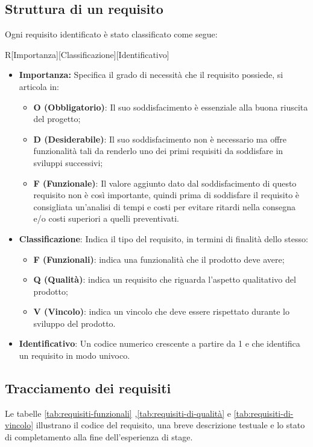\subsection{Struttura di un requisito}
Ogni requisito identificato è stato classificato come segue:
\begin{center}
	R[Importanza][Classificazione][Identificativo]
\end{center}
\begin{itemize}
	\item \textbf{Importanza:} Specifica il grado di necessità che il requisito possiede, si articola in:
	\begin{itemize}
		\item \textbf{O (Obbligatorio)}: Il suo soddisfacimento è essenziale alla buona riuscita del progetto;
		\item \textbf{D (Desiderabile)}: Il suo soddisfacimento non è necessario ma offre funzionalità tali da renderlo uno dei primi requisiti da soddisfare in sviluppi successivi;
		\item \textbf{F (Funzionale)}: Il valore aggiunto dato dal soddisfacimento di questo requisito non è così importante, quindi prima di soddisfare il requisito è consigliata un’analisi di tempi e costi per evitare ritardi nella consegna e/o costi superiori a quelli preventivati.
	\end{itemize}
	\item \textbf{Classificazione}: Indica il tipo del requisito, in termini di finalità dello stesso:
	\begin{itemize}
		\item \textbf{F (Funzionali)}: indica una funzionalità che il prodotto deve avere; 
		\item \textbf{Q (Qualità)}: indica un requisito che riguarda l'aspetto qualitativo del prodotto;
		\item \textbf{V (Vincolo)}: indica un vincolo che deve essere rispettato durante lo sviluppo del prodotto.
	\end{itemize} 
	\item \textbf{Identificativo}: Un codice numerico crescente a partire da 1 e che identifica un requisito in modo univoco. 
\end{itemize}

\newpage

\subsection{Tracciamento dei requisiti}
Le tabelle \ref{tab:requisiti-funzionali} ,\ref{tab:requisiti-di-qualità} e \ref{tab:requisiti-di-vincolo} illustrano il codice del requisito, una breve descrizione testuale e lo stato di completamento alla fine dell'esperienza di stage. \\

